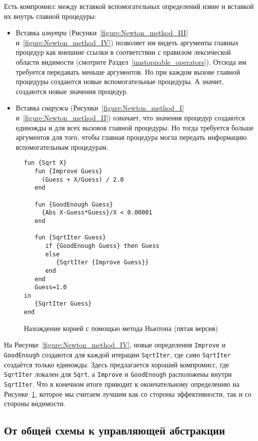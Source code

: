 Есть компромисс между вставкой вспомогательных определений извне и вставкой их внутрь главной процедуры:

\begin{itemize}
\item{Вставка \emph{изнутри} (Рисунки~\ref{figure:Newton_method_III} и~\ref{figure:Newton_method_IV}) позволяет им видеть аргументы главных процедур как внешние ссылки в соответствии с правилом лексической области видимости (смотрите Раздел~\ref{unstoppable_operators}). Отсюда им требуется передавать меньше аргументов. Но при каждом вызове главной процедуры создаются новые вспомогательные процедуры. А значит, создаются новые значения процедур.}

\item{Вставка \emph{снаружи} (Рисунки~\ref{figure:Newton_method_I} и~\ref{figure:Newton_method_II}) означает, что значения процедур создаются единожды и для всех вызовов главной процедуры. Но тогда требуется больше аргументов для того, чтобы главная процедура могла передать информацию вспомогательным процедурам.}
\end{itemize}

\begin{figure}
  \begin{lstlisting}
fun {Sqrt X}
   fun {Improve Guess}
     (Guess + X/Guess) / 2.0
   end

   fun {GoodEnough Guess}
     {Abs X-Guess*Guess}/X < 0.00001
   end

   fun {SqrtIter Guess}
      if {GoodEnough Guess} then Guess
      else
         {SqrtIter {Improve Guess}}
      end
   end
   Guess=1.0
in
   {SqrtIter Guess}
end
  \end{lstlisting}
  \caption{Нахождение корней с помощью метода Ньютона (пятая версия)}
  \label{figure:Newton_method_V}
\end{figure}

На Рисунке~\ref{figure:Newton_method_IV}, новые определения \lstinline!Improve! и \lstinline!GoodEnough! создаются для каждой итерации \lstinline!SqrtIter!, где само \lstinline!SqrtIter! создаётся только единожды. Здесь предлагается хороший компромисс, где \lstinline!SqrtIter! локален для \lstinline!Sqrt!, а \lstinline!Improve! и \lstinline!GoodEnough! расположены внутри \lstinline!SqrtIter!. Что в конечном итоге приводит к окончательному определению на Рисунке~\ref{figure:Newton_method_V}, которое мы считаем лучшим как со стороны эффективности, так и со стороны видимости.

\subsection{От общей схемы к управляющей абстракции}

